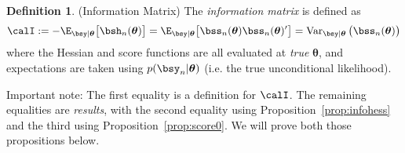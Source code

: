 \documentclass[12pt]{article}
\theoremstyle{plain}
\theoremstyle{definition}
\newtheorem{defn}[thm]{Definition}
\theoremstyle{remark}
\newtheorem*{rmk}{Remark}
\newcommand{\bstheta}{\boldsymbol{\theta}}
\newcommand{\bstildetheta}{\boldsymbol{\tilde{\theta}}}
\newcommand{\Var}{\operatorname{Var}}
\begin{document}
\begin{defn}(Information Matrix)
\label{defn:information}
The \emph{information matrix} is defined as
\begin{align*}
  \calI
  := -\E_{\bsy|\bstheta}\big[\bsh_n(\bstheta)\big]
  = \E_{\bsy|\bstheta}\big[\bss_n(\bstheta)\bss_n(\bstheta)'\big]
  = \Var_{\bsy|\bstheta}\big(\bss_n(\bstheta)\big)
\end{align*}
where the Hessian and score functions are all evaluated at \emph{true}
$\bstheta$, and expectations are taken using $p(\bsy_n|\bstheta)$ (i.e.
the true unconditional likelihood).

Important note: The first equality is a definition for $\calI$.
The remaining equalities are \emph{results}, with the second equality
using Proposition~\ref{prop:infohess} and the third using
Proposition~\ref{prop:score0}. We will prove both those propositions
below.
\end{defn}

\end{document}
